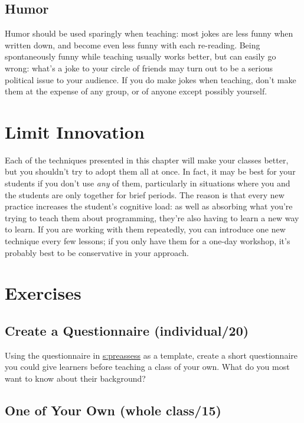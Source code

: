 \subsection{Humor}\label{humor}

Humor should be used sparingly when teaching: most jokes are less funny
when written down, and become even less funny with each re-reading.
Being spontaneously funny while teaching usually works better, but can
easily go wrong: what's a joke to your circle of friends may turn out to
be a serious political issue to your audience. If you do make jokes when
teaching, don't make them at the expense of any group, or of anyone
except possibly yourself.

\section{Limit Innovation}\label{s:classroom-innovate}

Each of the techniques presented in this chapter will make your classes
better, but you shouldn't try to adopt them all at once. In fact, it may
be best for your students if you don't use \emph{any} of them, particularly
in situations where you and the students are only together for brief
periods. The reason is that every new practice increases the student's
cognitive load: as well as absorbing what you're trying to teach them
about programming, they're also having to learn a new way to learn. If
you are working with them repeatedly, you can introduce one new
technique every few lessons; if you only have them for a one-day
workshop, it's probably best to be conservative in your approach.

\section{Exercises}\label{s:classroom-exercises}

\subsection{Create a Questionnaire (individual/20)}\label{create-a-questionnaire-individual20}

Using the questionnaire in \protect\hyperlink{APPENDIX}{s:preassess} as a template,
create a short questionnaire you could give learners before teaching a
class of your own. What do you most want to know about their background?

\subsection{One of Your Own (whole class/15)}\label{one-of-your-own-whole-class15}


